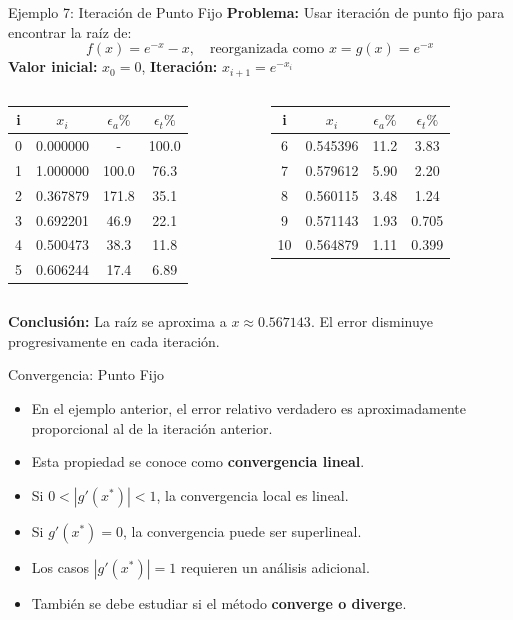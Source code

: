 \documentclass[../../main.tex]{subfiles}
\begin{document}
\begin{frame}{Ejemplo 7: Iteración de Punto Fijo}
\textbf{Problema:} Usar iteración de punto fijo para encontrar la raíz de:
\[
  f(x) = e^{-x} - x, \quad \text{reorganizada como } x = g(x) = e^{-x}
\]
\textbf{Valor inicial:} \( x_0 = 0 \), \quad \textbf{Iteración:} \( x_{i+1} = e^{-x_i} \)

\vspace{0.5em}
\begin{columns}
\begin{tabular}{|c|c|c|c|}
\hline
\textbf{i} & \( x_i \) & \( \epsilon_a \% \) & \( \epsilon_t \% \) \\
\hline
0 & 0.000000 & - & 100.0 \\
1 & 1.000000 & 100.0 & 76.3 \\
2 & 0.367879 & 171.8 & 35.1 \\
3 & 0.692201 & 46.9 & 22.1 \\
4 & 0.500473 & 38.3 & 11.8 \\
5 & 0.606244 & 17.4 & 6.89 \\
\hline
\end{tabular}

\begin{tabular}{|c|c|c|c|}
\hline
\textbf{i} & \( x_i \) & \( \epsilon_a \% \) & \( \epsilon_t \% \) \\
\hline
6 & 0.545396 & 11.2 & 3.83 \\
7 & 0.579612 & 5.90 & 2.20 \\
8 & 0.560115 & 3.48 & 1.24 \\
9 & 0.571143 & 1.93 & 0.705 \\
10 & 0.564879 & 1.11 & 0.399 \\
\hline
\end{tabular}
\end{columns}

\vspace{0.5em}
\textbf{Conclusión:} La raíz se aproxima a \( x \approx 0.567143 \). El error disminuye progresivamente en cada iteración.
\end{frame}

\begin{frame}{Convergencia: Punto Fijo}
\begin{itemize}
  \item En el ejemplo anterior, el error relativo verdadero es aproximadamente proporcional al de la iteración anterior.
  \item Esta propiedad se conoce como \textbf{convergencia lineal}.
  \item Si \(0<|g'(x^*)|<1\), la convergencia local es lineal.
  \item Si \(g'(x^*)=0\), la convergencia puede ser superlineal.
  \item Los casos \(|g'(x^*)|=1\) requieren un análisis adicional.
  \item También se debe estudiar si el método \textbf{converge o diverge}.
\end{itemize}
\end{frame}
\end{document}
